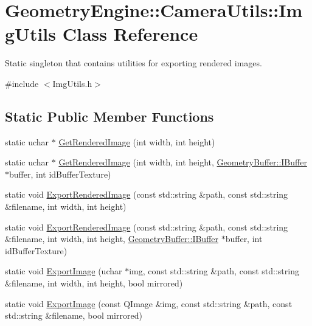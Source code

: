 \hypertarget{class_geometry_engine_1_1_camera_utils_1_1_img_utils}{}\section{Geometry\+Engine\+::Camera\+Utils\+::Img\+Utils Class Reference}
\label{class_geometry_engine_1_1_camera_utils_1_1_img_utils}


Static singleton that contains utilities for exporting rendered images.  




{\ttfamily \#include $<$Img\+Utils.\+h$>$}

\subsection*{Static Public Member Functions}
\begin{DoxyCompactItemize}
\item 
static uchar $\ast$ \mbox{\hyperlink{class_geometry_engine_1_1_camera_utils_1_1_img_utils_aa8a0083c869377b3f1ab3f6e9c824f98}{Get\+Rendered\+Image}} (int width, int height)
\item 
static uchar $\ast$ \mbox{\hyperlink{class_geometry_engine_1_1_camera_utils_1_1_img_utils_a8561bc5cbacfb42698476894fa9d47d0}{Get\+Rendered\+Image}} (int width, int height, \mbox{\hyperlink{class_geometry_engine_1_1_geometry_buffer_1_1_i_buffer}{Geometry\+Buffer\+::\+I\+Buffer}} $\ast$buffer, int id\+Buffer\+Texture)
\item 
static void \mbox{\hyperlink{class_geometry_engine_1_1_camera_utils_1_1_img_utils_ad85642ff5fb226921696263e345ac687}{Export\+Rendered\+Image}} (const std\+::string \&path, const std\+::string \&filename, int width, int height)
\item 
static void \mbox{\hyperlink{class_geometry_engine_1_1_camera_utils_1_1_img_utils_af53a23abfa0e07de2a15666261facc6d}{Export\+Rendered\+Image}} (const std\+::string \&path, const std\+::string \&filename, int width, int height, \mbox{\hyperlink{class_geometry_engine_1_1_geometry_buffer_1_1_i_buffer}{Geometry\+Buffer\+::\+I\+Buffer}} $\ast$buffer, int id\+Buffer\+Texture)
\item 
static void \mbox{\hyperlink{class_geometry_engine_1_1_camera_utils_1_1_img_utils_a672f5fbd8053c1de7a2c90fccd88a225}{Export\+Image}} (uchar $\ast$img, const std\+::string \&path, const std\+::string \&filename, int width, int height, bool mirrored)
\item 
static void \mbox{\hyperlink{class_geometry_engine_1_1_camera_utils_1_1_img_utils_a7a0af40d6d8d34ccb4321166b7878d69}{Export\+Image}} (const Q\+Image \&img, const std\+::string \&path, const std\+::string \&filename, bool mirrored)
\end{DoxyCompactItemize}


